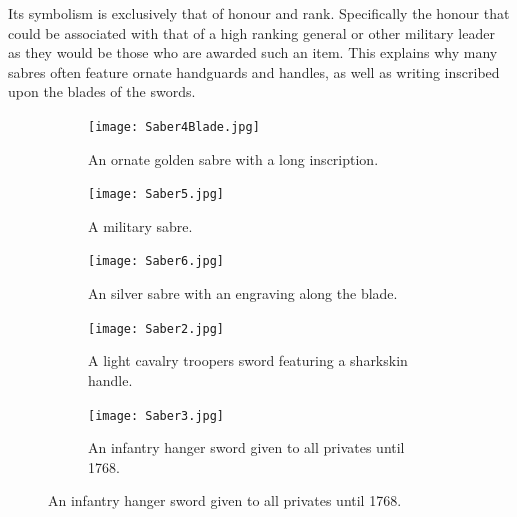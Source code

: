 \documentclass{article}
\begin{document}
Its symbolism is exclusively that of honour and rank. Specifically the honour that could be associated with that of a high ranking general or other military leader as they would be those who are awarded such an item. This explains why many sabres often feature ornate handguards and handles, as well as writing inscribed upon the blades of the swords.

\begin{figure}[H]
\centering
\caption{A collection of images from sabres at the National Army Museum.}
\label{fig:sabreImages}
\begin{subfigure}{0.3\textwidth}
    \texttt{[image: Saber4Blade.jpg]}
    \caption{An ornate golden sabre with a long inscription.}
    \label{fig:Saber4}
\end{subfigure}
\begin{subfigure}{0.3\textwidth}
    \texttt{[image: Saber5.jpg]}
    \caption{A military sabre.}
    \label{fig:Saber5}
\end{subfigure}
\begin{subfigure}{0.3\textwidth}
    \texttt{[image: Saber6.jpg]}
    \caption{An silver sabre with an engraving along the blade.}
    \label{fig:Saber6}
\end{subfigure}
\begin{subfigure}{0.3\textwidth}
    \texttt{[image: Saber2.jpg]}
    \caption{A light cavalry troopers sword featuring a sharkskin handle.}
    \label{fig:Saber2}
\end{subfigure}
\begin{subfigure}{0.3\textwidth}
    \texttt{[image: Saber3.jpg]}
    \caption{An infantry hanger sword given to all privates until 1768.}
    \label{fig:Saber3}
\end{subfigure}
\end{figure}
\end{document}
